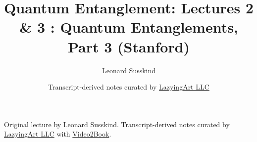 \documentclass[11pt,oneside]{book}
\begin{document}
\frontmatter
\title{Quantum Entanglement: Lectures 2 \& 3 : Quantum Entanglements, Part 3 (Stanford)}
\author{Leonard Susskind}
\date{Transcript-derived notes curated by \href{https://lazying.art}{LazyingArt LLC}}
\maketitle
\begin{center}
\small Original lecture by Leonard Susskind. Transcript-derived notes curated by \href{https://lazying.art}{LazyingArt LLC} with \href{https://github.com/lachlanchen/Video2Book}{Video2Book}.
\end{center}
\clearpage
\mainmatter

\end{document}

